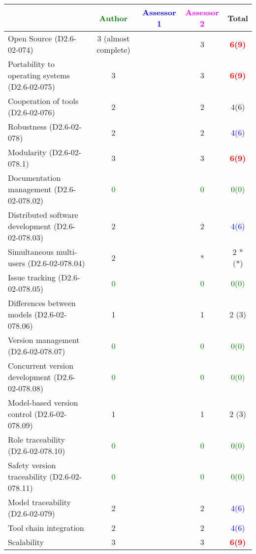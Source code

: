 \begin{tabular}{|l | c | c | c | c|}
\hline
& \textcolor{green}{Author} & \textcolor{blue}{Assessor 1} & \textcolor{magenta}{Assessor 2} & Total \\
\hline 
Open Source (D2.6-02-074) & 3     (almost complete)& & 3     & \textcolor{red}{\textbf{6(9)}}  \\
\hline 
Portability to operating systems (D2.6-02-075) & 3     & & 3     & \textcolor{red}{\textbf{6(9)}}   \\
\hline
Cooperation of tools (D2.6-02-076) & 2     & & 2     &  4(6) \\
\hline
Robustness (D2.6-02-078) & 2     & & 2     & \textcolor{blue}{4(6)}  \\
\hline
Modularity (D2.6-02-078.1) & 3     & & 3     & \textcolor{red}{\textbf{6(9)}}  \\
\hline
Documentation management (D2.6-02-078.02) & \textcolor{green}{0} & & \textcolor{green}{0} & \textcolor{green}{0(0)}  \\
\hline
Distributed software development (D2.6-02-078.03)  & 2     & & 2     & \textcolor{blue}{4(6)}  \\
\hline
Simultaneous multi-users (D2.6-02-078.04)   & 2     & & * & 2 *(*) \\
\hline
Issue tracking (D2.6-02-078.05) & \textcolor{green}{0} & & \textcolor{green}{0} & \textcolor{green}{0(0)}  \\
\hline
Differences between models (D2.6-02-078.06) & 1     & & 1     & 2 (3) \\
\hline
Version management (D2.6-02-078.07) & \textcolor{green}{0} & & \textcolor{green}{0} & \textcolor{green}{0(0)}  \\
\hline
Concurrent version development (D2.6-02-078.08) & \textcolor{green}{0} & & \textcolor{green}{0} & \textcolor{green}{0(0)}  \\
\hline
Model-based version control (D2.6-02-078.09) & 1     & & 1     & 2 (3) \\
\hline
Role traceability (D2.6-02-078.10) & \textcolor{green}{0} & & \textcolor{green}{0} & \textcolor{green}{0(0)}  \\
\hline
Safety version traceability (D2.6-02-078.11) & \textcolor{green}{0} & & \textcolor{green}{0} & \textcolor{green}{0(0)}  \\
\hline
Model traceability (D2.6-02-079) & 2     & & 2     & \textcolor{blue}{4(6)}  \\
\hline
Tool chain integration & 2     & & 2     & \textcolor{blue}{4(6)}  \\
\hline
Scalability & 3     & & 3     & \textcolor{red}{\textbf{6(9)}}  \\
\hline
\end{tabular}

